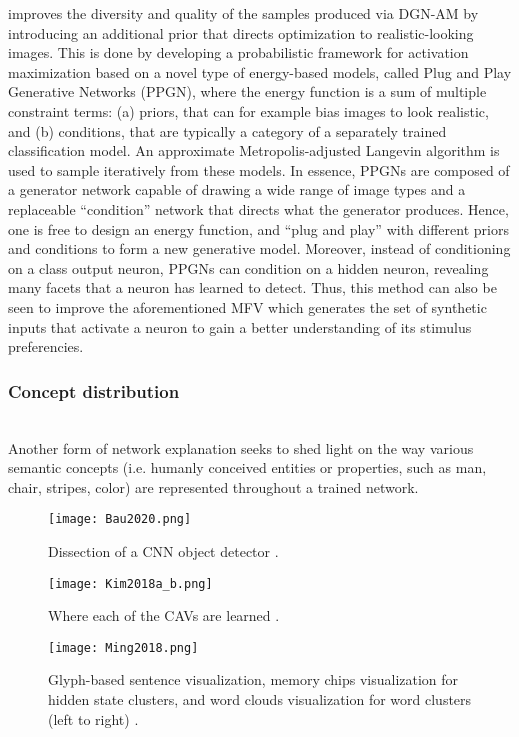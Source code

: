 \documentclass[journal]{IEEEtran}
\begin{document}
\cite{Nguyen2017} improves the diversity and quality of the samples produced via DGN-AM \cite{Nguyen2016} by introducing an additional prior that directs optimization to realistic-looking images. This is done by developing a probabilistic framework for activation maximization based on a novel type of energy-based models, called Plug and Play Generative Networks (PPGN), where the energy function is a sum of multiple constraint terms: (a) priors, that can for example bias images to look realistic, and (b) conditions, that are typically a category of a separately trained classification model. An approximate Metropolis-adjusted Langevin algorithm is used to sample iteratively from these models. In essence, PPGNs are composed of a generator network capable of drawing a wide range of image types and a replaceable “condition” network that directs what the generator produces. Hence, one is free to design an energy function, and “plug and play” with different priors and conditions to form a new generative model. Moreover, instead of conditioning on a class output neuron, PPGNs can condition on a hidden neuron, revealing many facets that a neuron has learned to detect. Thus, this method can also be seen to improve the aforementioned MFV \cite{Nguyen2016a} which generates the set of synthetic inputs that activate a neuron to gain a better understanding of its stimulus preferencies.

\subsubsection{Concept distribution}
\hfill\\
Another form of network explanation seeks to shed light on the way various semantic concepts (i.e. humanly conceived entities or properties, such as man, chair, stripes, color) are represented throughout a trained network.

\begin{figure}
  \texttt{[image: Bau2020.png]}
  \caption{Dissection of a CNN object detector \cite{Bau2020}.}
\end{figure}

\begin{figure}
  \texttt{[image: Kim2018a\_b.png]}
  \caption{Where each of the CAVs are learned \cite{Kim2018a}.}
\end{figure}

\begin{figure}
  \texttt{[image: Ming2018.png]}
  \caption{Glyph-based sentence visualization, memory chips visualization for hidden state clusters, and word clouds visualization for word clusters (left to right) \cite{Ming2018}.}
\end{figure}
\end{document}
